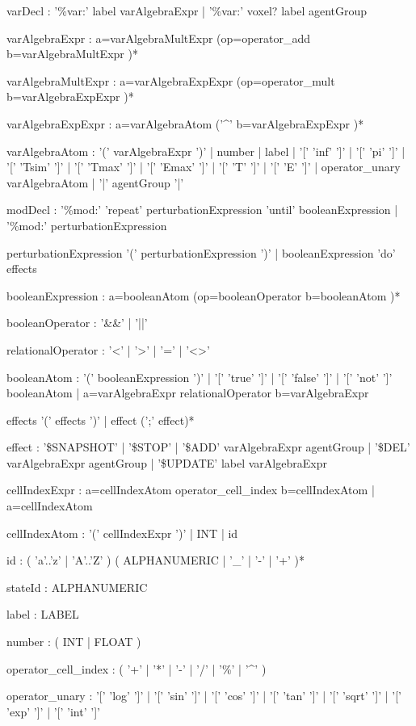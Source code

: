 \documentclass[english]{report}
\newcommand{\newbnf}[1]{\colorbox[rgb]{0.8,0.8,1}{#1}}
\begin{document}
\begin{bnfsource}
varDecl :
  '\%var:' label varAlgebraExpr
  | '\%var:' \newbnf{voxel?} label agentGroup

varAlgebraExpr :
  a=varAlgebraMultExpr (op=operator_add b=varAlgebraMultExpr )*
  
varAlgebraMultExpr :
  a=varAlgebraExpExpr (op=operator_mult b=varAlgebraExpExpr )*
  
varAlgebraExpExpr :
  a=varAlgebraAtom ('^' b=varAlgebraExpExpr )*
  
varAlgebraAtom :
  '(' varAlgebraExpr ')'
  | number
  | label
  | '[' 'inf' ']'
  | '[' 'pi' ']'
  | '[' 'Tsim' ']'
  | '[' 'Tmax' ']'
  | '[' 'Emax' ']'
  | '[' 'T' ']'
  | '[' 'E' ']'
  | operator_unary varAlgebraAtom
  | \newbnf{'|' agentGroup '|'}
  
modDecl :
  '\%mod:' 'repeat' perturbationExpression 'until' booleanExpression
  | '\%mod:' perturbationExpression

perturbationExpression
  '(' perturbationExpression ')'
  | booleanExpression 'do' effects

booleanExpression :
  a=booleanAtom (op=booleanOperator b=booleanAtom )*
  
booleanOperator :
  '&&' | '||'

relationalOperator :
  '<' | '>' | '=' | '<>'

booleanAtom :
  '(' booleanExpression ')'
  | '[' 'true' ']'
  | '[' 'false' ']'
  | '[' 'not' ']' booleanAtom
  | a=varAlgebraExpr relationalOperator b=varAlgebraExpr

effects
  '(' effects ')'
  | effect (';' effect)*

effect :
  '\$SNAPSHOT'
  | '\$STOP'
  | '\$ADD' varAlgebraExpr agentGroup
  | '\$DEL' varAlgebraExpr agentGroup
  | '\$UPDATE' label varAlgebraExpr
  
\newbnf{cellIndexExpr :}
  \newbnf{a=cellIndexAtom operator_cell_index b=cellIndexAtom}
  \newbnf{| a=cellIndexAtom}
  
\newbnf{cellIndexAtom :}
  \newbnf{'(' cellIndexExpr ')'}
  \newbnf{| INT}
  \newbnf{| id}
  
id :
  ( 'a'..'z' | 'A'..'Z' ) ( ALPHANUMERIC | '_' | '-' | '+' )*

stateId :
  ALPHANUMERIC

label :
  LABEL

number :
  ( INT | FLOAT )
  
\newbnf{operator_cell_index :}
  \newbnf{( '+' | '*' | '-' | '/' | '\%' | '^' )}

operator_unary :
  '[' 'log' ']'
  | '[' 'sin' ']'
  | '[' 'cos' ']'
  | '[' 'tan' ']'
  | '[' 'sqrt' ']'
  | '[' 'exp' ']'
  | '[' 'int' ']'


\end{bnfsource}
\end{document}
